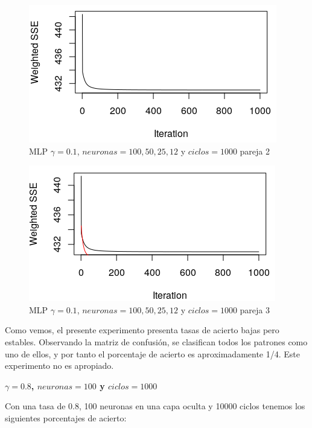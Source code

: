 \documentclass[11pt,spanish,listoffigures,listoftables]{workluis}
\begin{document}
\begin{figure}[H]
\centering
\includegraphics[scale=0.5]{011005025122}
\caption{MLP $\gamma = 0.1$, $neuronas = 100,50,25,12$ y $ciclos = 1000$ pareja 2}
\end{figure} 

\begin{figure}[H]
\centering
\includegraphics[scale=0.5]{011005025123}
\caption{MLP $\gamma = 0.1$, $neuronas = 100,50,25,12$ y $ciclos = 1000$ pareja 3}
\end{figure} 

\par Como vemos, el presente experimento presenta tasas de acierto bajas pero estables. Observando la matriz de confusión, se clasifican todos los patrones como uno de ellos, y por tanto el porcentaje de acierto es aproximadamente 1/4. Este experimento no es apropiado.


\par \textbf{$\gamma = 0.8$, $neuronas = 100$ y $ciclos = 1000$}

\par Con una tasa de 0.8, 100 neuronas en una capa oculta y 10000 ciclos tenemos los siguientes porcentajes de acierto:
\end{document}
